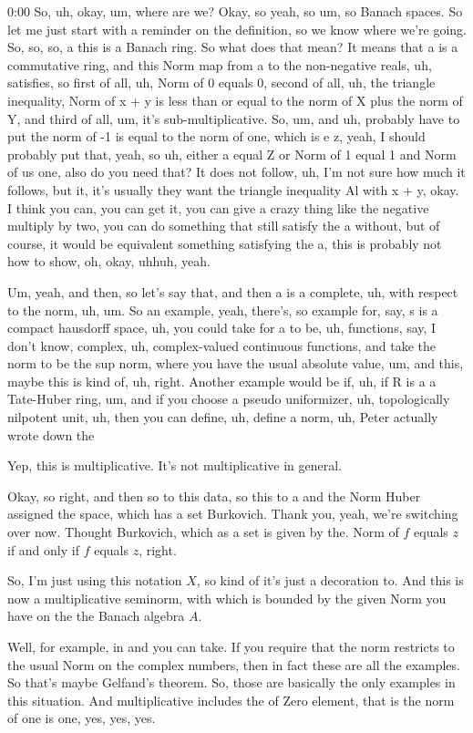 \begin{unfinished}{0:00}
So, uh, okay, um, where are we? Okay, so yeah, so um, so Banach spaces. So let me just start with a reminder on the definition, so we know where we're going. So, so, so, a this is a Banach ring. So what does that mean? It means that a is a commutative ring, and this Norm map from a to the non-negative reals, uh, satisfies, so first of all, uh, Norm of 0 equals 0, second of all, uh, the triangle inequality, Norm of x + y is less than or equal to the norm of X plus the norm of Y, and third of all, um, it's sub-multiplicative. So, um, and uh, probably have to put the norm of -1 is equal to the norm of one, which is e z, yeah, I should probably put that, yeah, so uh, either a equal Z or Norm of 1 equal 1 and Norm of us one, also do you need that? It does not follow, uh, I'm not sure how much it follows, but it, it's usually they want the triangle inequality Al with x + y, okay. I think you can, you can get it, you can give a crazy thing like the negative multiply by two, you can do something that still satisfy the a without, but of course, it would be equivalent something satisfying the a, this is probably not how to show, oh, okay, uhhuh, yeah.

Um, yeah, and then, so let's say that, and then a is a complete, uh, with respect to the norm, uh, um. So an example, yeah, there's, so example for, say, s is a compact hausdorff space, uh, you could take for a to be, uh, functions, say, I don't know, complex, uh, complex-valued continuous functions, and take the norm to be the sup norm, where you have the usual absolute value, um, and this, maybe this is kind of, uh, right. Another example would be if, uh, if R is a a Tate-Huber ring, um, and if you choose a pseudo uniformizer, uh, topologically nilpotent unit, uh, then you can define, uh, define a norm, uh, Peter actually wrote down the

Yep, this is multiplicative. It's not multiplicative in general.

Okay, so right, and then so to this data, so this to a and the Norm Huber assigned the space, which has a set Burkovich. Thank you, yeah, we're switching over now. Thought Burkovich, which as a set is given by the. Norm of $f$ equals $z$ if and only if $f$ equals $z$, right.

So, I'm just using this notation $X$, so kind of it's just a decoration to. And this is now a multiplicative seminorm, with which is bounded by the given Norm you have on the the Banach algebra $A$.

Well, for example, in and you can take. If you require that the norm restricts to the usual Norm on the complex numbers, then in fact these are all the examples. So that's maybe Gelfand's theorem. So, those are basically the only examples in this situation. And multiplicative includes the of Zero element, that is the norm of one is one, yes, yes, yes.


\end{unfinished}
